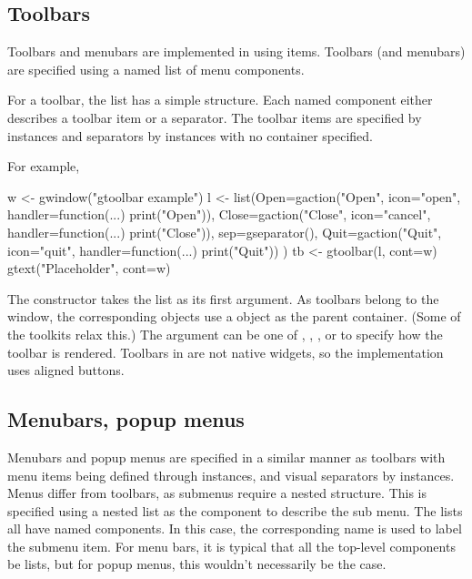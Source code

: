 \subsection{Toolbars}
\label{sec:gWidgets-toolbars}
Toolbars and menubars are implemented in  using
 items. Toolbars (and menubars) are specified using a named
list of menu components. 

For a toolbar, the list has a simple structure. Each named component
either describes a toolbar item or a separator. The toolbar items are
specified by  instances and separators by
 instances with no container specified.

For example,
\begin{Schunk}
\begin{Sinput}
 w <- gwindow("gtoolbar example")
 l <- list(Open=gaction("Open", icon="open", 
             handler=function(...) print("Open")),
           Close=gaction("Close", icon="cancel", 
             handler=function(...) print("Close")),
           sep=gseparator(),
           Quit=gaction("Quit", icon="quit", 
             handler=function(...) print("Quit"))
           )
 tb <- gtoolbar(l, cont=w)
 gtext("Placeholder", cont=w)
\end{Sinput}
\end{Schunk}


The  constructor takes the list as its first
argument.  As toolbars belong to the window, the corresponding
 objects use a  object as the
parent container. (Some of the toolkits relax this.)  The argument
 can be one of , ,
, or  to specify how the toolbar is
rendered. Toolbars in  are not native widgets, so
the implementation uses aligned buttons.


\subsection{Menubars, popup menus}
\label{sec:gWidgets-menubars}

Menubars and popup menus are specified in a similar manner as toolbars with menu items
being defined through  instances, and visual separators
by  instances. Menus differ from toolbars, as
submenus require a nested structure. This  is specified using a
nested list as the component to describe the sub menu. The lists all
have named components. In this case, the corresponding name is used to
label the submenu item. For menu bars, it is typical that all the
top-level components be lists, but for popup menus, this wouldn't
necessarily be the case.

